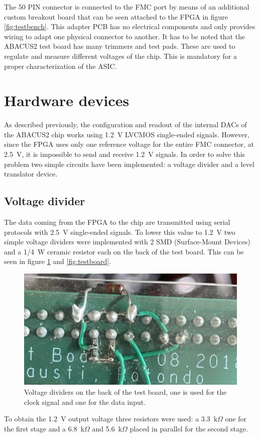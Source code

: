 \noindent The 50 PIN connector is connected to the FMC port by means of an additional custom breakout board that can be seen attached to the FPGA in figure \ref{fig:testbench}. This adapter PCB has no electrical components and only provides wiring to adapt one physical connector to another.
It has to be noted that the ABACUS2 test board has many trimmers and test pads.
These are used to regulate and measure different voltages of the chip. This is mandatory for a proper characterization of the ASIC.
\section{Hardware devices}\label{hardware}
\noindent As described previously, the configuration and readout of the internal DACs of the ABACUS2 chip works using 1.2~V LVCMOS single-ended signals.
However, since the FPGA uses only one reference voltage for the entire FMC connector, at 2.5~V, it is impossible to send and receive 1.2~V signals.
In order to solve this problem two simple circuits have been implemented: a voltage divider and a level translator device.
\subsection{Voltage divider}
The data coming from the FPGA to the chip are transmitted using serial protocols with 2.5~V single-ended signals.
To lower this value to 1.2~V two simple voltage dividers were implemented with 2 SMD (Surface-Mount Devices) and a 1/4~W ceramic resistor each on the back of the test board. This can be seen in figure \ref{fig:voltagedivider} and \ref{fig:testboard}.
\begin{figure}[H]
	\centering
	\includegraphics[width=0.6\linewidth]{IMG/ch5/VOLTAGEDIVIDER}
	\caption{Voltage dividers on the back of the test board, one is used for the clock signal and one for the data input.}
	\label{fig:voltagedivider}
\end{figure}
\noindent To obtain the 1.2~V output voltage three resistors were used: a 3.3~k$\Omega$ one for the first stage and a 6.8~k$\Omega$ and 5.6~k$\Omega$ placed in parallel for the second stage.
